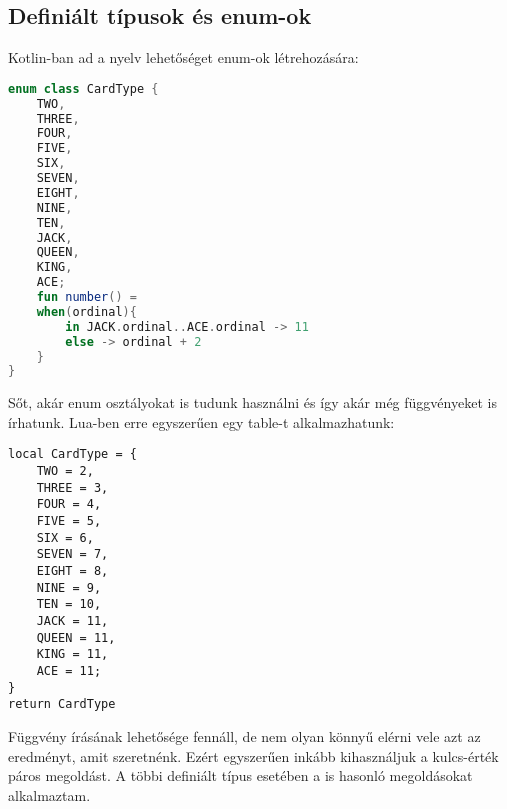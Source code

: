 \subsection{Definiált típusok és enum-ok}
\label{subsec:p_enum}
Kotlin-ban ad a nyelv lehetőséget enum-ok létrehozására:
\scriptsize
\begin{lstlisting}[language = Kotlin]
enum class CardType {
	TWO,
	THREE,
	FOUR,
	FIVE,
	SIX,
	SEVEN,
	EIGHT,
	NINE,
	TEN,
	JACK,
	QUEEN,
	KING,
	ACE;
	fun number() =
	when(ordinal){
		in JACK.ordinal..ACE.ordinal -> 11
		else -> ordinal + 2
	}
}
\end{lstlisting}
\normalsize
Sőt, akár enum osztályokat is tudunk használni és így akár még függvényeket is írhatunk. Lua-ben erre egyszerűen egy table-t alkalmazhatunk:
\scriptsize
\begin{lstlisting}[style=Lua]
local CardType = {
	TWO = 2,
	THREE = 3,
	FOUR = 4,
	FIVE = 5,
	SIX = 6,
	SEVEN = 7,
	EIGHT = 8,
	NINE = 9,
	TEN = 10,
	JACK = 11,
	QUEEN = 11,
	KING = 11,
	ACE = 11;
}
return CardType
\end{lstlisting}
\normalsize
Függvény írásának lehetősége fennáll, de nem olyan könnyű elérni vele azt az eredményt, amit szeretnénk. Ezért egyszerűen inkább kihasználjuk a kulcs-érték páros megoldást. A többi definiált típus esetében a is hasonló megoldásokat alkalmaztam.

\newpage

